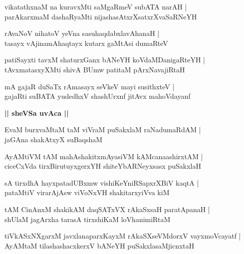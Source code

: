 \documentclass[twoside,12pt,openright]{book}
\newcounter{shloka}[chapter]
\def\uvaca#1{\centerline{{\large\textbf{#1}}}}
\begin{document}
\begin{shloka}%
vikatathxnaM na kuravxMti saMgaRmeV subATA narAH |\\
parAkarxmaM dashaRyaMti nijashasAtxrXsatxrXvaSaRNeYH
\end{shloka}

\begin{shloka}%
rAvaNoV nihatoV yeVna sasuhaqdabxlavAhanaH |\\
tasayx vAjinamAhaqtayx kutarx gaMtAsi dumaRteV 
\end{shloka}

\begin{shloka}%
patiSayxti tavxM shaturxGanx bANeYH koVdaMDanigaRteYH |\\
tAvxmatasxyXMti shivA BUmw patitaM pArxNavajiRtaH
\end{shloka}

\begin{shloka}%
mA gajaR duSaTx rAmasayx seVkeV mayi susithxteV |\\
gajaRti suBATA yudedhxV shashUrxnf jitAvx mahoVdayanf 
\end{shloka}

\uvaca{|| sheVSa uvAca ||}

\begin{shloka}%
EvaM burxvaMtaM taM viVraM puSakxlaM raNadumaRdAM |\\
jaGAna shakAtxyX suBaqshaM 
\end{shloka}

\begin{shloka}%
AyAMtiVM tAM mahAshakitxmAyasiVM kAMcanaashirxtAM |\\
ciceCxVda tirxBirutuyxgerxYH shiteYbARNeyxsasx puSakxlaH 
\end{shloka}

\begin{shloka}%
sA tirxdhA hayxpatadUBxmw vishiKeYniRSapxrXBiV kaqtA |\\
pataMtiV virarAjAsw viVoNxVH shakitarxyiVva kiM 
\end{shloka}

\begin{shloka}%
tAM CinAnxM shakikAM daqSATxVX rAkaSxsaH paratApanaH |\\
shUlaM jagArxha tarasA tirxshiKaM loVhanimiRtaM
\end{shloka}

\begin{shloka}%
tiVkASxNXgarxM javxlanaparxKayxM rAkaSXseVMdorxV vayxmoVcayatf |\\
AyAMtaM tilashashacxkerxV bANeYH puSakxlasaMjicnxtaH 
\end{shloka}
\end{document}
